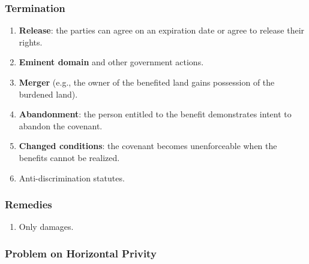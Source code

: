 \subsubsection{Termination}

\begin{enumerate}
    \item \textbf{Release}: the parties can agree on an expiration date or 
    agree to release their rights.
    \item \textbf{Eminent domain} and other government actions.
    \item \textbf{Merger} (e.g., the owner of the benefited land gains 
    possession of the burdened land).
    \item \textbf{Abandonment}: the person entitled to the benefit 
    demonstrates intent to abandon the covenant.
    \item \textbf{Changed conditions}: the covenant becomes unenforceable when 
    the benefits cannot be realized.
    \item Anti-discrimination statutes.
\end{enumerate}

\subsubsection{Remedies}

\begin{enumerate}
    \item Only damages.
\end{enumerate}

\subsubsection{Problem on Horizontal Privity}

